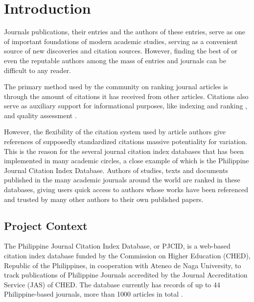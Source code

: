 \chapter{Introduction}
Journals publications, their entries and the authors of these entries, serve as one of important foundations of modern academic studies, serving as a convenient source of new discoveries and citation sources. However, finding the best of or even the reputable authors among the mass of entries and journals can be difficult to any reader. 

The primary method used by the community on ranking journal articles is through the amount of citations it has received from other articles. Citations also serve as auxiliary support for informational purposes, like indexing and ranking \cite{rank}, and quality assessment \cite{quality}. 

However, the flexibility of the citation system used by article authors give references of supposedly standardized citations massive potentiality for variation. This is the reason for the several journal citation index databases that has been implemented in many academic circles, a close example of which is the Philippine Journal Citation Index Database. Authors of studies, texts and documents published in the many academic journals around the world are ranked in these databases, giving users quick access to authors whose works have been referenced and trusted by many other authors to their own published papers.
\section{Project Context}
The Philippine Journal Citation Index Database, or PJCID, is a web-based citation index database funded by the Commission on Higher Education (CHED), Republic of the Philippines, in cooperation with Ateneo de Naga University, to track publications of Philippine Journals accredited by the Journal Accreditation Service (JAS) of CHED. The database currently has records of up to 44 Philippine-based journals, more than 1000 articles in total \cite{pjcid}.

